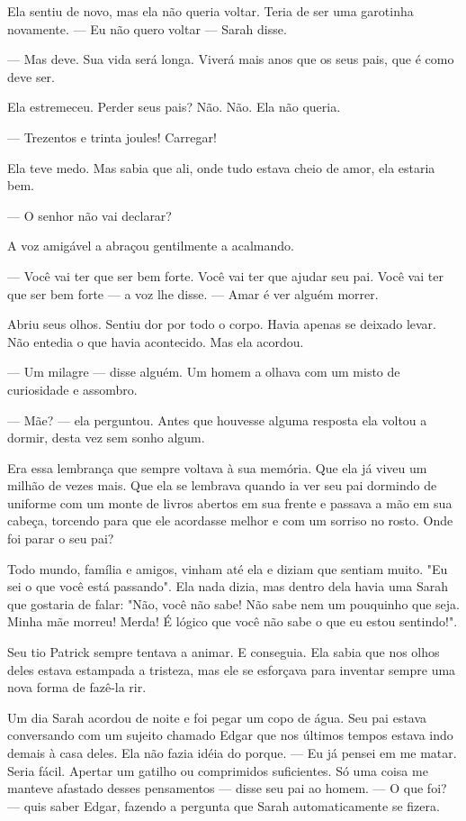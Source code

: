 Ela sentiu de novo, mas ela não queria voltar. Teria de ser uma garotinha novamente.
--- Eu não quero voltar --- Sarah disse.

--- Mas deve. Sua vida será longa. Viverá mais anos que os seus pais, que é como deve ser.

Ela estremeceu. Perder seus pais? Não. Não. Ela não queria.

--- Trezentos e trinta joules! Carregar!

Ela teve medo. Mas sabia que ali, onde tudo estava cheio de amor, ela estaria bem.

--- O senhor não vai declarar?

A voz amigável a abraçou gentilmente a acalmando.

--- Você vai ter que ser bem forte. Você vai ter que ajudar seu pai. Você vai ter que ser bem forte --- a voz lhe disse. --- Amar é ver alguém morrer.

Abriu seus olhos. Sentiu dor por todo o corpo. Havia apenas se deixado levar. Não entedia o que havia acontecido. Mas ela acordou.

--- Um milagre --- disse alguém. Um homem a olhava com um misto de curiosidade e assombro.

--- Mãe? --- ela perguntou. Antes que houvesse alguma resposta ela voltou a dormir, desta vez sem sonho algum.

Era essa lembrança que sempre voltava à sua memória. Que ela já viveu um milhão de vezes mais. Que ela se lembrava quando ia ver seu pai dormindo de uniforme com um monte de livros abertos em sua frente e passava a mão em sua cabeça, torcendo para que ele acordasse melhor e com um sorriso no rosto. Onde foi parar o seu pai?

Todo mundo, família e amigos, vinham até ela e diziam que sentiam muito. "Eu sei o que você está passando". Ela nada dizia, mas dentro dela havia uma Sarah que gostaria de falar: "Não, você não sabe! Não sabe nem um pouquinho que seja. Minha mãe morreu! Merda! É lógico que você não sabe o que eu estou sentindo!".

Seu tio Patrick sempre tentava a animar. E conseguia. Ela sabia que nos olhos deles estava estampada a tristeza, mas ele se esforçava para inventar sempre uma nova forma de fazê-la rir.

Um dia Sarah acordou de noite e foi pegar um copo de água. Seu pai estava conversando com um sujeito chamado Edgar que nos últimos tempos estava indo demais à casa deles. Ela não fazia idéia do porque.
--- Eu já pensei em me matar. Seria fácil. Apertar um gatilho ou comprimidos suficientes. Só uma coisa me manteve afastado desses pensamentos --- disse seu pai ao homem.
--- O que foi? --- quis saber Edgar, fazendo a pergunta que Sarah automaticamente se fizera.

